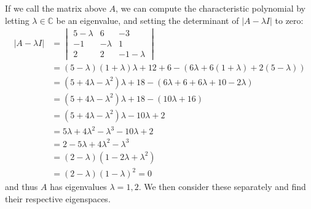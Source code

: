 \documentclass{article}
\begin{document}
\begin{solution}
If we call the matrix above $A$, we can compute the characteristic polynomial by letting $\lambda\in\mathbb{C}$ be an eigenvalue, and setting the determinant of $|A-\lambda I|$ to zero:
\begin{align*}
|A-\lambda I| &= 
\begin{vmatrix}
5-\lambda & 6 & -3 \\
-1 & -\lambda & 1 \\
2 & 2 & -1-\lambda
\end{vmatrix}
\\
&= (5-\lambda)(1+\lambda)\lambda +12 +6 -\left( 6\lambda +6(1+\lambda) +2(5-\lambda) \right) \\
&= (5+4\lambda-\lambda^{2})\lambda +18 -\left( 6\lambda +6 +6\lambda +10 -2\lambda \right) \\
&= (5+4\lambda-\lambda^{2})\lambda +18 -( 10\lambda +16 ) \\
&= (5+4\lambda-\lambda^{2})\lambda -10\lambda +2 \\
&= 5\lambda +4\lambda^{2} -\lambda^{3} -10\lambda +2 \\
&= 2 -5\lambda +4\lambda^{2} -\lambda^{3} \\
&= (2-\lambda)(1 -2\lambda +\lambda^{2}) \\
&= (2-\lambda)(1 -\lambda)^{2} = 0
\end{align*}
and thus $A$ has eigenvalues $\lambda = 1,2$. We then consider these separately and find their respective eigenspaces.


\end{solution}
\end{document}
